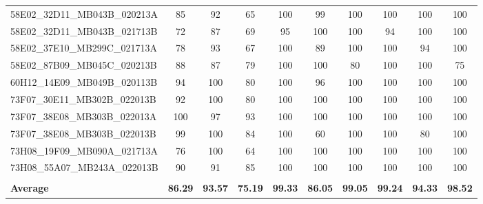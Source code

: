 \begin{adjustbox}{width=\textwidth}
\begin{tabular}{|l|ccc|ccc|ccc|}
	58E02\_32D11\_MB043B\_020213A & 85  & 92  & 65 & 100 & 99  & 100 & 100 & 100 & 100 \\
	58E02\_32D11\_MB043B\_021713B & 72  & 87  & 69 & 95  & 100 & 100 & 94  & 100 & 100 \\
	58E02\_37E10\_MB299C\_021713A & 78  & 93  & 67 & 100 & 89  & 100 & 100 & 94  & 100 \\
	58E02\_87B09\_MB045C\_020213B & 88  & 87  & 79 & 100 & 100 & 80  & 100 & 100 & 75  \\
	60H12\_14E09\_MB049B\_020113B & 94  & 100 & 80 & 100 & 96  & 100 & 100 & 100 & 100 \\
	73F07\_30E11\_MB302B\_022013B & 92  & 100 & 80 & 100 & 100 & 100 & 100 & 100 & 100 \\
	73F07\_38E08\_MB303B\_022013A & 100 & 97  & 93 & 100 & 100 & 100 & 100 & 100 & 100 \\
	73F07\_38E08\_MB303B\_022013B & 99  & 100 & 84 & 100 & 60  & 100 & 100 & 80  & 100 \\
	73H08\_19F09\_MB090A\_021713A & 76  & 100 & 64 & 100 & 100 & 100 & 100 & 100 & 100 \\
	73H08\_55A07\_MB243A\_022013B & 90  & 91  & 85 & 100 & 100 & 100 & 100 & 100 & 100 \\
	&     &     &    &     &     &     &     &     &     \\ \hline
	\textbf{Average} &
	\textbf{86.29} &
	\textbf{93.57} &
	\textbf{75.19} &
	\textbf{99.33} &
	\textbf{86.05} &
	\textbf{99.05} &
	\textbf{99.24} &
	\textbf{94.33} &
	\textbf{98.52} \\ \hline
\end{tabular}
\end{adjustbox}